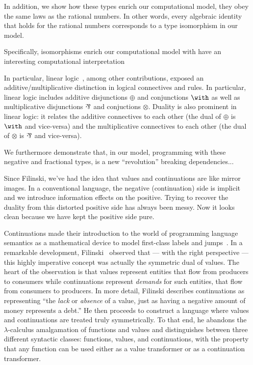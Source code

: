\documentclass[preprint]{sigplanconf}
\begin{document}
{In addition, we show how these types enrich our computational model, they
obey the same laws as the rational numbers. In other words, every algebraic
identity that holds for the rational numbers corresponds to a type
isomorphism in our model.

Specifically, isomorphisms enrich our computational model with have an
interesting computational interpretation

In particular, linear logic~\cite{Girard87tcs}, among other contributions,
exposed an additive/multiplicative distinction in logical connectives and
rules. In particular, linear logic includes additive disjunctions $\oplus$
and conjunctions $\with$ as well as multiplicative disjunctions $\parr$ and
conjuctions $\otimes$. Duality is also prominent in linear logic: it relates
the additive connectives to each other (the dual of $\oplus$ is $\with$ and
vice-versa) and the multiplicative connectives to each other (the dual of
$\otimes$ is $\parr$ and vice-versa).

We furthermore demonstrate that, in our model,
programming with these negative and fractional types, is a new ``revolution''
breaking dependencies...

Since Filinski, we've had the
idea that values and continuations are like mirror images. In a conventional
language, the negative (continuation) side is implicit and we introduce
information effects on the positive. Trying to recover the duality from this
distorted positive side has always been messy. Now it looks clean because we
have kept the positive side pure.

Continuations made their introduction to the world of programming language
semantics as a mathematical device to model first-class labels and
jumps~\cite{springerlink:10.1023/A:1010026413531}. In a remarkable
development, Filinski~\cite{Filinski:1989:DCI:648332.755574} observed that
--- with the right perspective --- this highly imperative concept was
actually the symmetric dual of values. The heart of the observation is that
values represent entities that flow from producers to consumers while
continuations represent \emph{demands} for such entities, that flow from
consumers to producers. In more detail, Filinski describes continuations as
representing ``the \emph{lack} or \emph{absence} of a value, just as having a
negative amount of money represents a debt.'' He then proceeds to construct a
language where values and continuations are treated truly symmetrically. To
that end, he abandons the $\lambda$-calculus amalgamation of functions and
values and distinguishes between three different syntactic classes:
functions, values, and continuations, with the property that any function can
be used either as a value transformer or as a continuation transformer.

}
\end{document}
